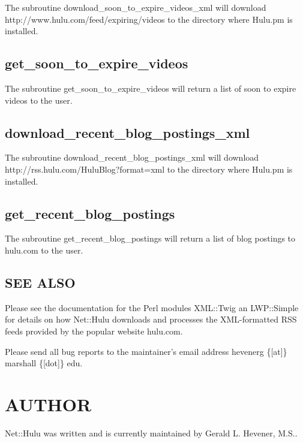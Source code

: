 The subroutine download\_soon\_to\_expire\_videos\_xml will download http://www.hulu.com/feed/expiring/videos
to the directory where Hulu.pm is installed.

\subsection*{get\_soon\_to\_expire\_videos\label{get_soon_to_expire_videos}}


The subroutine get\_soon\_to\_expire\_videos will return a list of soon to expire videos to the user.

\subsection*{download\_recent\_blog\_postings\_xml\label{download_recent_blog_postings_xml}}


The subroutine download\_recent\_blog\_postings\_xml will download http://rss.hulu.com/HuluBlog?format=xml
to the directory where Hulu.pm is installed.

\subsection*{get\_recent\_blog\_postings\label{get_recent_blog_postings}}


The subroutine get\_recent\_blog\_postings will return a list of blog postings to hulu.com to the user.

\subsection*{SEE ALSO\label{SEE_ALSO}}


Please see the documentation for the Perl modules XML::Twig an LWP::Simple
for details on how Net::Hulu downloads and processes the XML-formatted
RSS feeds provided by the popular website hulu.com.



Please send all bug reports to the maintainer's email address hevenerg \{[at]\} marshall \{[dot]\} edu.

\section{AUTHOR\label{AUTHOR}}


Net::Hulu was written and is currently maintained by Gerald L. Hevener, M.S..

